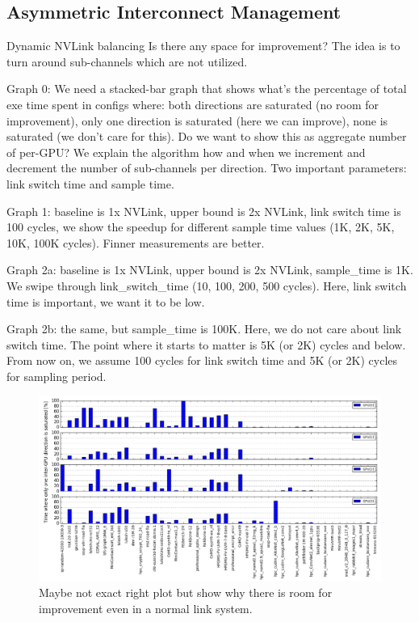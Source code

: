 \subsection{Asymmetric Interconnect Management}
\label{interconnect}

Dynamic NVLink balancing Is there any space for improvement? The idea is to turn 
around sub-channels which are not utilized. 

Graph 0: We need a stacked-bar graph that shows what’s the percentage of total 
exe time spent in configs where: both directions are saturated (no room for 
improvement), only one direction is saturated (here we can improve), none is 
saturated (we don’t care for this). Do we want to show this as aggregate number 
of per-GPU?
We explain the algorithm how and when we increment and decrement the number of 
sub-channels per direction. Two important parameters: link switch time and 
sample time.

Graph 1: baseline is 1x NVLink, upper bound is 2x NVLink, link switch time is 
100 cycles, we show the speedup for different sample time values (1K, 2K, 5K, 
10K, 100K cycles). Finner measurements are better.

Graph 2a: baseline is 1x NVLink, upper bound is 2x NVLink, sample\_time is 1K. 
We swipe through link\_switch\_time (10, 100, 200, 500 cycles). Here, link 
switch time is important, we want it to be low.

Graph 2b: the same, but sample\_time is 100K. Here, we do not care about link 
switch time. The point where it starts to matter is 5K (or 2K) cycles and below. 
From now on, we assume 100 cycles for link switch time and 5K (or 2K) cycles for 
sampling period.

\begin{figure}[tp]
    \centering
    \includegraphics[width=1.0\columnwidth]{figures/link-motivation.jpg}
    \caption{Maybe not exact right plot but show why there is room for 
improvement even in a normal link system.}
    \label{fig:link-motivation}
\end{figure}


